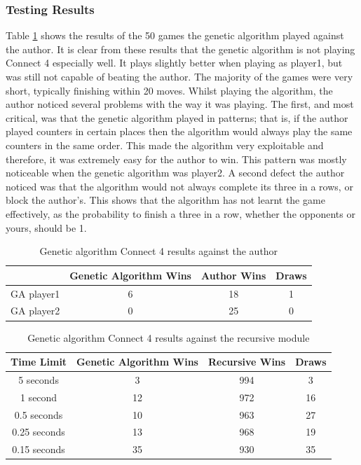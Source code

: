 \subsubsection{Testing Results}
Table \ref{tab:game} shows the results of the 50 games the genetic algorithm played against the author. It is clear from these results that the genetic algorithm is not playing Connect 4 especially well. It plays slightly better when playing as player1, but was still not capable of beating the author. The majority of the games were very short, typically finishing within 20 moves. Whilst playing the algorithm, the author noticed several problems with the way it was playing. The first, and most critical, was that the genetic algorithm played in patterns; that is, if the author played counters in certain places then the algorithm would always play the same counters in the same order. This made the algorithm very exploitable and therefore, it was extremely easy for the author to win. This pattern was mostly noticeable when the genetic algorithm was player2. A second defect the author noticed was that the algorithm would not always complete its three in a rows, or block the author's. This shows that the algorithm has not learnt the game effectively, as the probability to finish a three in a row, whether the opponents or yours, should be 1.
\begin{table}[tp]
   \begin{minipage}{\textwidth}
      \begin{center}
         \begin{tabular}{c|c|c|c}
           & Genetic Algorithm Wins & Author Wins & Draws\\
           \hline
           GA player1 & 6 & 18 & 1 \\
           GA player2 & 0 & 25 & 0
         \end{tabular}
      \end{center}
   \end{minipage}
   \caption{Genetic algorithm Connect 4 results against the author}
   \label{tab:game}
\end{table}
\begin{table}[tp]
   \begin{minipage}{\textwidth}
      \begin{center}
         \begin{tabular}{c|c|c|c}
           Time Limit & Genetic Algorithm Wins & Recursive Wins & Draws\\
           \hline
           5 seconds & 3 & 994 & 3 \\
           1 second & 12 & 972 & 16 \\
           0.5 seconds & 10 & 963 & 27 \\
           0.25 seconds & 13 & 968 & 19 \\
           0.15 seconds & 35 & 930 & 35
         \end{tabular}
      \end{center}
   \end{minipage}
   \caption{Genetic algorithm Connect 4 results against the recursive module}
   \label{tab:gare}
\end{table}
